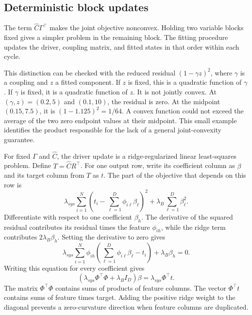 \subsection{Deterministic block updates}

The term \(\widehat C\Gamma^\top\) makes the joint objective nonconvex. Holding two variable blocks fixed gives a simpler problem in the remaining block. The fitting procedure updates the driver, coupling matrix, and fitted states in that order within each cycle.

This distinction can be checked with the reduced residual \((1-\gamma z)^2\), where \(\gamma\) is a coupling and \(z\) a fitted component. If \(z\) is fixed, this is a quadratic function of \(\gamma\). If \(\gamma\) is fixed, it is a quadratic function of \(z\). It is not jointly convex. At \((\gamma,z)=(0.2,5)\) and \((0.1,10)\), the residual is zero. At the midpoint \((0.15,7.5)\), it is \((1-1.125)^2=1/64\). A convex function could not exceed the average of the two zero endpoint values at their midpoint. This small example identifies the product responsible for the lack of a general joint-convexity guarantee.

For fixed \(\Gamma\) and \(\widehat C\), the driver update is a ridge-regularized linear least-squares problem. Define \(T=\widehat C R^\top\). For one output row, write its coefficient column as \(\beta\) and its target column from \(T\) as \(t\). The part of the objective that depends on this row is
\begin{equation}
\label{eq:icsor_ridge_row_objective}
\lambda_{sys}\sum_{i=1}^{N}
\left(t_i-\sum_{\ell=1}^{D}\phi_{i\ell}\beta_\ell\right)^2
+\lambda_B\sum_{\ell=1}^{D}\beta_\ell^2.
\end{equation}
Differentiate with respect to one coefficient \(\beta_h\). The derivative of the squared residual contributes its residual times the feature \(\phi_{ih}\), while the ridge term contributes \(2\lambda_B\beta_h\). Setting the derivative to zero gives
\begin{equation}
\label{eq:icsor_ridge_scalar_normal}
\lambda_{sys}\sum_{i=1}^{N}\phi_{ih}
\left(\sum_{\ell=1}^{D}\phi_{i\ell}\beta_\ell-t_i\right)
+\lambda_B\beta_h=0.
\end{equation}
Writing this equation for every coefficient gives
\begin{equation}
\label{eq:icsor_ridge_normal_equations}
\left(\lambda_{sys}\Phi^\top\Phi+\lambda_BI_D\right)\beta
=\lambda_{sys}\Phi^\top t.
\end{equation}
The matrix \(\Phi^\top\Phi\) contains sums of products of feature columns. The vector \(\Phi^\top t\) contains sums of feature times target. Adding the positive ridge weight to the diagonal prevents a zero-curvature direction when feature columns are duplicated.

